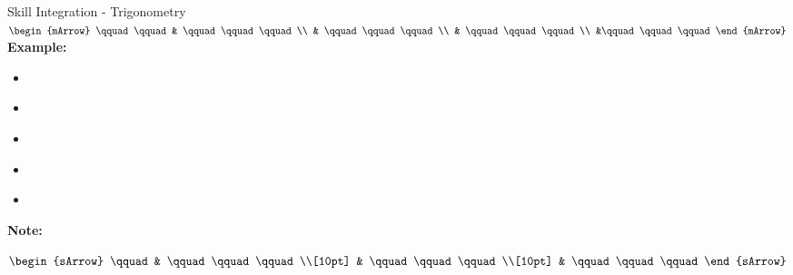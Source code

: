 \clearpage
{}
\begin{boxSkill}{Skill \thenskill \quad Integration - Trigonometry}
    \noindent%
	 $\begin{mArrow}
        \qquad \qquad &    \qquad\qquad\qquad          \\
                      & \qquad\qquad\qquad \\
			          & \qquad\qquad\qquad  \\
			          &\qquad\qquad\qquad
 	 \end{mArrow}$\\[0.5cm]
	 

	\textbf{Example:}
	\begin{itemize}[leftmargin=0.8cm]
	     \item[] $\qquad\qquad\qquad    $
	     \item[] $\qquad\qquad\qquad     $
	     \item[] $\qquad\qquad\qquad      $ 
	     \item[] $\qquad\qquad\qquad    $
	     \item[] $\qquad\qquad\qquad  $	 
	\end{itemize}
	
	\tcbline
	
    \textbf{Note:}\\[0.6cm]
	\begin{warningEnv}
	    $\begin{sArrow}
	        \qquad   & \qquad\qquad\qquad \\[10pt]
	  	             & \qquad\qquad\qquad                                                                        \\[10pt] 
                     & \qquad\qquad\qquad 				   
		 \end{sArrow}$		   
    \end{warningEnv}
\end{boxSkill}



\pShortSolutionSubsection
\printshortsolutions



